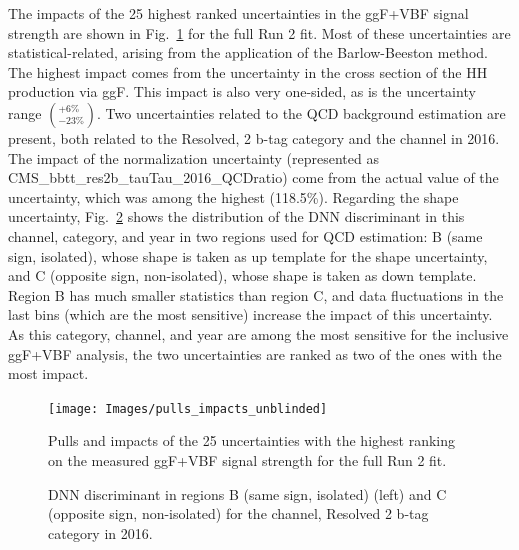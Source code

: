 \documentclass[../main.tex]{subfiles}
\begin{document}
The impacts of the 25 highest ranked uncertainties in the ggF+VBF signal strength are shown in Fig.~\ref{hh:fig:pulls_impacts} for the full Run 2 fit. Most of these uncertainties are statistical-related, arising from the application of the Barlow-Beeston method. The highest impact comes from the uncertainty in the cross section of the HH production via ggF. This impact is also very one-sided, as is the uncertainty range $\left({}^{+6\%}_{-23\%}\right)$. Two uncertainties related to the QCD background estimation are present, both related to the Resolved, 2 b-tag category and the \tauh\tauh channel in 2016. The impact of the normalization uncertainty (represented as CMS\_bbtt\_res2b\_tauTau\_2016\_QCDratio) come from the actual value of the uncertainty, which was among the highest (118.5\%). Regarding the shape uncertainty, Fig.~\ref{hh:fig:dnn_res2b_2016_tautau} shows the distribution of the DNN discriminant in this channel, category, and year in two regions used for QCD estimation: B (same sign, isolated), whose shape is taken as up template for the shape uncertainty, and C (opposite sign, non-isolated), whose shape is taken as down template. Region B has much smaller statistics than region C, and data fluctuations in the last bins (which are the most sensitive) increase the impact of this uncertainty. As this category, channel, and year are among the most sensitive for the inclusive ggF+VBF analysis, the two uncertainties are ranked as two of the ones with the most impact.

\begin{figure}[h!]
\begin{center}
\texttt{[image: Images/pulls\_impacts\_unblinded]}
\end{center}
\caption[Pulls and impacts]{Pulls and impacts of the 25 uncertainties with the highest ranking on the measured ggF+VBF signal strength for the full Run 2 fit.}
\label{hh:fig:pulls_impacts}
\end{figure}

\begin{figure}[h!]
\begin{center}
\end{center}
\caption[DNN discriminant in region B, \tauh\tauh{} channel, and Resolved 2 b-tag category in 2016]{DNN discriminant in regions B (same sign, isolated) (left) and C (opposite sign, non-isolated) for the \tauh\tauh{} channel, Resolved 2 b-tag category in 2016.}
\label{hh:fig:dnn_res2b_2016_tautau}
\end{figure}
\end{document}

